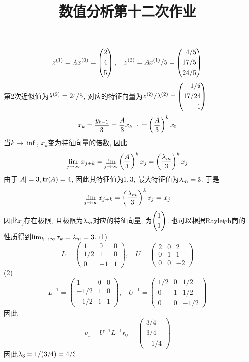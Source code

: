 \documentclass[UTF8]{ctexart}
\title{数值分析第十二次作业}
\begin{document}
 
\maketitle
{}
$$z^{(1)}=Ax^{(0)} = \left( \begin{aligned} 2\\4\\5 \end{aligned} \right),\quad z^{(2)} = Ax^{(1)}/5 = \left( \begin{aligned} 4/5\\17/5\\24/5 \end{aligned} \right)$$
第2次近似值为$\lambda^{(2)} = 24/5$, 对应的特征向量为$z^{(2)}/\lambda^{(2)} = \left( \begin{aligned} 1/6\\17/24\\1 \end{aligned} \right)$
$$x_{k}= \frac{y_{k-1}}{3}=\frac{A}{3}x_{k-1}=\left( \frac{A}{3} \right)^kx_0$$
当$k\to \inf$, $x_k$变为特征向量的倍数, 因此
$$\lim_{j\to \infty}x_{j+k} = \lim_{j\to \infty} \left( \frac{A}{3} \right)^kx_j=\left( \frac{\lambda_m}{3} \right)^kx_j$$
由于$|A|=3,\operatorname{tr}(A)=4$, 因此其特征值为$1,3$, 最大特征值为$\lambda_m=3$. 于是
$$\lim_{j\to \infty}x_{j+k}=\left( \frac{\lambda_m}{3} \right)^kx_j=x_j$$
因此$x_j$存在极限, 且极限为$\lambda_m$对应的特征向量, 为$\left( \begin{aligned} 1\\1 \end{aligned} \right)$. 也可以根据Rayleigh商的性质得到$\lim_{k\to \infty}\tau_k=\lambda_m=3$. 
(1)\\
$$L=\begin{pmatrix}1&0&0\\1/2&1&0\\0&-1&1 \end{pmatrix},\quad U = \begin{pmatrix}2&0&2\\0&1&1\\0&0&-2\end{pmatrix}$$
(2)\\
$$L^{-1}=\begin{pmatrix}1&0&0\\-1/2&1&0\\-1/2&1&1 \end{pmatrix},\quad U^{-1} = \begin{pmatrix}1/2&0&1/2\\0&1&1/2\\0&0&-1/2\end{pmatrix}$$
    因此$$v_1=U^{-1}L^{-1}v_0 = \begin{pmatrix} 3/4\\3/4\\-1/4\end{pmatrix}$$
    因此$\lambda_3=1/(3/4)=4/3$
\end{document}
